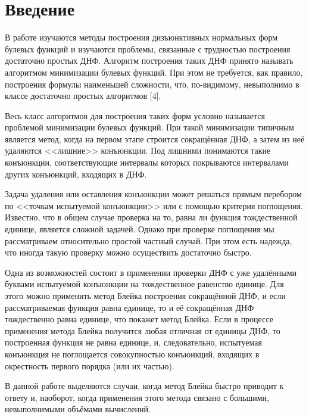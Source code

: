 \documentclass[12pt,a4paper,oneside,fleqn,leqno]{article}
\theoremstyle{definition}
\begin{document}
\newpage
\renewcommand{\contentsname}{Содержание}
\tableofcontents


\newpage
\section*{Введение}
	В работе изучаются методы построения дизъюнктивных нормальных форм булевых функций и изучаются проблемы, связанные с трудностью построения достаточно простых ДНФ. Алгоритм построения таких ДНФ принято называть алгоритмом минимизации булевых функций. При этом не требуется, как правило, построения формулы наименьшей сложности, что, по-видимому, невыполнимо в классе достаточно простых алгоритмов [4]. \par
	Весь класс алгоритмов для построения таких форм условно называется проблемой минимизации булевых функций. При такой минимизации типичным является метод, когда на первом этапе строится сокращённая ДНФ, а затем из неё удаляются <<лишние>> конъюнкции. Под лишними понимаются такие конъюнкции, соответствующие интервалы которых покрываются интервалами других конъюнкций, входящих в ДНФ.\par
	Задача удаления или оставления конъюнкции может решаться прямым перебором по <<точкам испытуемой конъюнкции>> или с помощью критерия поглощения. Известно, что в общем случае проверка на то, равна ли функция тождественной единице, является сложной задачей. Однако при проверке поглощения мы рассматриваем относительно простой частный случай. При этом есть надежда, что иногда такую проверку можно осуществить достаточно быстро.\par
	Одна из возможностей состоит в применении проверки ДНФ с уже удалёнными буквами испытуемой конъюнкции на тождественное равенство единице. Для этого можно применить метод Блейка построения сокращённой ДНФ, и если рассматриваемая функция равна единице, то и её сокращённая ДНФ тождественно равна единице, что покажет метод Блейка. Если в процессе применения метода Блейка получится любая отличная от единицы ДНФ, то построенная функция не равна единице, и, следовательно, испытуемая конъюнкция не поглощается совокупностью конъюнкций, входящих в окрестность первого порядка (или их частью).\par
	В данной работе выделяются случаи, когда метод Блейка быстро приводит к ответу и, наоборот, когда применения этого метода связано с большими, невыполнимыми объёмами вычислений.\par
\end{document}
